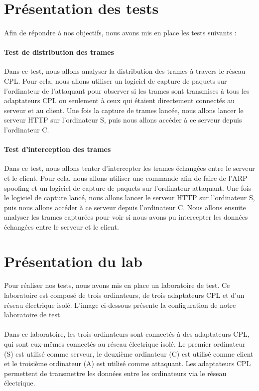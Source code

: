 \documentclass[a4paper,twocolumn]{report}
\begin{document}
\section{Présentation des tests}
\paragraph{}Afin de répondre à nos objectifs, nous avons mis en place les tests suivants :
\paragraph{Test de distribution des trames} Dans ce test, nous allons analyser la distribution
des trames à travers le réseau CPL. Pour cela, nous allons utiliser un logiciel de capture
de paquets sur l'ordinateur de l'attaquant pour observer si les trames sont transmises à tous
les adaptateurs CPL ou seulement à ceux qui étaient directement connectés au serveur et au client.
Une fois la capture de trames lancée, nous allons lancer le serveur HTTP sur l'ordinateur S,
puis nous allons accéder à ce serveur depuis l'ordinateur C. 

\paragraph{Test d'interception des trames} Dans ce test, nous allons tenter d'intercepter
les trames échangées entre le serveur et le client. Pour cela, nous allons utiliser une commande
afin de faire de l'ARP spoofing et un logiciel de capture de paquets sur l'ordinateur attaquant.
Une fois le logiciel de capture lancé, nous allons lancer le serveur HTTP sur l'ordinateur S,
puis nous allons accéder à ce serveur depuis l'ordinateur C. Nous allons ensuite analyser
les trames capturées pour voir si nous avons pu intercepter les données échangées entre le serveur et le client.

\section{Présentation du lab}
\paragraph{}Pour réaliser nos tests, nous avons mis en place un laboratoire de test.
Ce laboratoire est composé de trois ordinateurs, de trois adaptateurs CPL et d'un réseau électrique isolé.
L'image ci-dessous présente la configuration de notre laboratoire de test.
\paragraph{}Dans ce laboratoire, les trois ordinateurs sont connectés à des adaptateurs CPL,
qui sont eux-mêmes connectés au réseau électrique isolé. Le premier ordinateur (S) est utilisé comme serveur,
le deuxième ordinateur (C) est utilisé comme client et le troisième ordinateur (A) est utilisé comme attaquant.
Les adaptateurs CPL permettent de transmettre les données entre les ordinateurs via le réseau électrique.
\end{document}

